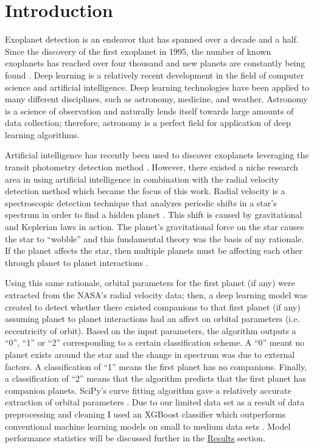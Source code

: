 \documentclass[12pt]{article}
\begin{document}
\section{Introduction}
\label{sec:intro}
Exoplanet detection is an endeavor that has spanned over a decade and a half. Since the discovery of the first exoplanet in 1995, the number of known exoplanets has reached over four thousand and new planets are constantly being found \cite{mayor1995jupiter}. Deep learning is a relatively recent development in the field of computer science and artificial intelligence. Deep learning technologies have been applied to many different disciplines, such as astronomy, medicine, and weather. Astronomy is a science of observation and naturally lends itself towards large amounts of data collection; therefore, astronomy is a perfect field for application of deep learning algorithms. \par
Artificial intelligence has recently been used to discover exoplanets leveraging the transit photometry detection method \cite{shallue2018identifying}. However, there existed a niche research area in using artificial intelligence in combination with the radial velocity detection method which became the focus of this work. Radial velocity is a spectroscopic detection technique that analyzes periodic shifts in a star's spectrum in order to find a hidden planet \cite{wright2017radial}. This shift is caused by gravitational and Keplerian laws in action. The planet’s gravitational force on the star causes the star to “wobble” and this fundamental theory was the basis of my rationale. If the planet affects the star, then multiple planets must be affecting each other through planet to planet interactions \cite{pearson2019search}. \par
Using this same rationale, orbital parameters for the first planet (if any) were extracted from the NASA’s radial velocity data; then, a deep learning model was created to detect whether there existed companions to that first planet (if any) assuming planet to planet interactions had an affect on orbital parameters (i.e. eccentricity of orbit). Based on the input parameters, the algorithm outputs a “0”, “1” or “2” corresponding to a certain classification scheme. A “0” meant no planet exists around the star and the change in spectrum was due to external factors. A classification of “1” means the first planet has no companions. Finally, a classification of  “2” means that the algorithm predicts that the first planet has companion planets. SciPy’s curve fitting algorithm gave a relatively accurate extraction of orbital parameters \cite{scipy}. Due to our limited data set as a result of data preprocessing and cleaning I used an XGBoost classifier which outperforms conventional machine learning models on small to medium data sets \cite{xgboost}. Model performance statistics will be discussed further in the \hyperref[sec:results]{Results} section.
\end{document}
